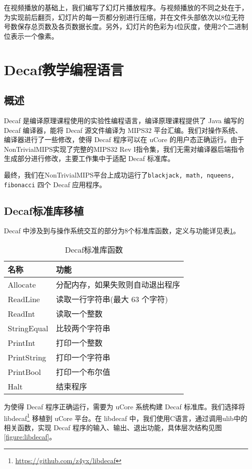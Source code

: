 在视频播放的基础上，我们编写了幻灯片播放程序。与视频播放的不同之处在于，为实现前后翻页，幻灯片的每一页都分别进行压缩，并在文件头部依次以8位无符号数保存总页数及各页数据长度。另外，幻灯片的色彩为4位灰度，使用2个二进制位表示一个像素。


\section{Decaf教学编程语言}

\subsection{概述}
Decaf 是编译原理课程使用的实验性编程语言，编译原理课程提供了 Java 编写的 Decaf 编译器，能将 Decaf 源文件编译为 MIPS32 平台汇编。我们对操作系统、编译器进行了一些修改，使得 Decaf 程序可以在 uCore 的用户态正确运行。由于NonTrivialMIPS实现了完整的MIPS32 Rev I指令集，我们无需对编译器后端指令生成部分进行修改，主要工作集中于适配 Decaf 标准库。

最终，我们在NonTrivialMIPS平台上成功运行了\texttt{blackjack, math, nqueens, fibonacci} 四个 Decaf 应用程序。

\subsection{Decaf标准库移植}
Decaf 中涉及到与操作系统交互的部分为8个标准库函数，定义与功能详见表\ref{table:decaf_stl}。

\begin{table}[htbp]
    \centering
    \caption{Decaf标准库函数}
    \label{table:decaf_stl}
\begin{tabular}{|l|l|}
\hline
名称 & 功能 \\ \hline
Allocate & 分配内存，如果失败则自动退出程序 \\ \hline
ReadLine & 读取一行字符串(最大 63 个字符) \\ \hline
ReadInt & 读取一个整数 \\ \hline
StringEqual & 比较两个字符串 \\ \hline
PrintInt & 打印一个整数 \\ \hline
PrintString & 打印一个字符串 \\ \hline
PrintBool & 打印一个布尔值 \\ \hline
Halt & 结束程序 \\ \hline
\end{tabular}
\end{table}

为使得 Decaf 程序正确运行，需要为 uCore 系统构建 Decaf 标准库。我们选择将 libdecaf\footnote{\url{https://github.com/z4yx/libdecaf}} 移植到 uCore 平台。在 libdecaf 中，我们使用C语言，通过调用ulib中的相关函数，实现 Decaf 程序的输入、输出、退出功能，具体层次结构见图\ref{figure:libdecaf}。

